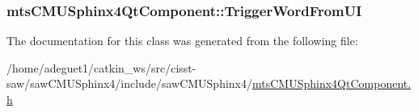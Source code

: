 \hypertarget{classmts_c_m_u_sphinx4_qt_component_a3d2e5606f0e3d92278f42b020bfec766}{
\subsubsection[{Trigger\-Word\-From\-U\-I}]{ mts\-C\-M\-U\-Sphinx4\-Qt\-Component\-::\-Trigger\-Word\-From\-U\-I\hspace{0.3cm}{\ttfamily [protected]}}}\label{classmts_c_m_u_sphinx4_qt_component_a3d2e5606f0e3d92278f42b020bfec766}


The documentation for this class was generated from the following file\-:\begin{DoxyCompactItemize}
\item 
/home/adeguet1/catkin\-\_\-ws/src/cisst-\/saw/saw\-C\-M\-U\-Sphinx4/include/saw\-C\-M\-U\-Sphinx4/\hyperlink{mts_c_m_u_sphinx4_qt_component_8h}{mts\-C\-M\-U\-Sphinx4\-Qt\-Component.\-h}\end{DoxyCompactItemize}
